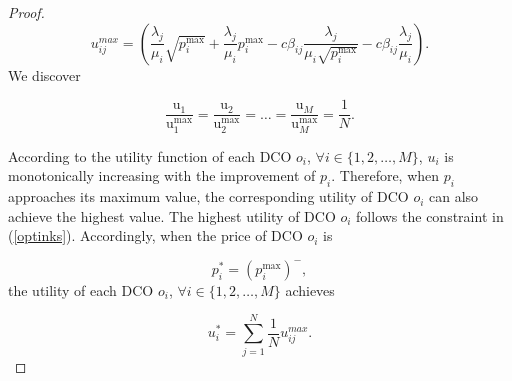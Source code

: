 \documentclass[twocolumn,10pt]{IEEEtran}
\newtheorem{proof}{Proof}
\begin{document}
\begin{proof}
\begin{equation}
u^{max}_{ij}=\left( {\frac{{{\lambda _j}}}{{{\mu _i}}}\sqrt {p_i^{\max }}  + \frac{{{\lambda _j}}}{{{\mu _i}}}p_i^{\max } - c{\beta _{ij}}\frac{{{\lambda _j}}}{{{\mu _i}\sqrt {p_i^{\max }} }} - c{\beta _{ij}}\frac{{{\lambda _j}}}{{{\mu _i}}}} \right).
\end{equation}
We discover

\begin{equation}
{\frac{{{\text{u}}_{1}  }}{{{\text{u}}_{1}^{\max }  }} = \frac{{{\text{u}}_{2}  }}{{{\text{u}}_{2}^{\max } }} = \ldots = \frac{{{\text{u}}_{M}  }}{{{\text{u}}_{M}^{\max }  }}} = \frac{1}{N}.
\end{equation}

According to the utility function of each DCO $o_i$, $\forall i \in \{1,2,\ldots,M\}$, $u_i$ is monotonically increasing with the improvement of $p_i$. Therefore, when $p_i$ approaches its maximum value, the corresponding utility of DCO $o_i$ can also achieve the highest value. The highest utility of DCO $o_i$ follows the constraint in (\ref{optinks}). Accordingly, when the price of DCO $o_{i}$ is

\begin{equation}
    p_{i}^*= {\left({p_{i}^{\max }} \right)}^ -,
\end{equation}
the utility of each DCO $o_i$, $\forall i \in \{1,2,\ldots,M\}$ achieves

\begin{equation}
    u_i^*= {\sum\limits_{j = 1}^N \frac{1}{N}{u^{max}_{ij}} }.
\end{equation} \end{proof}








\end{document}
